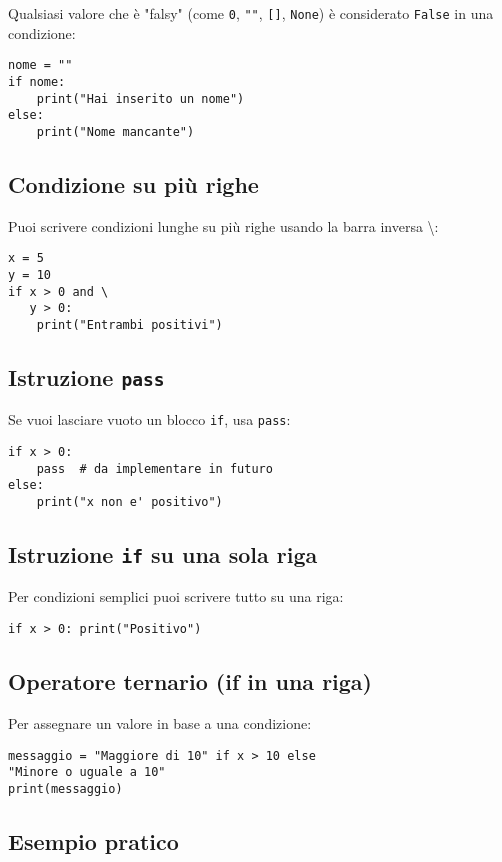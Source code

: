 \documentclass[a4paper,12pt]{article}
\begin{document}
Qualsiasi valore che è "falsy" (come \texttt{0}, \texttt{""}, \texttt{[]}, \texttt{None}) è considerato \texttt{False} in una condizione:
\begin{lstlisting}
nome = ""
if nome:
    print("Hai inserito un nome")
else:
    print("Nome mancante")
\end{lstlisting}

\subsection*{Condizione su più righe}

Puoi scrivere condizioni lunghe su più righe usando la barra inversa \textbackslash:
\begin{lstlisting}
x = 5
y = 10
if x > 0 and \
   y > 0:
    print("Entrambi positivi")
\end{lstlisting}

\subsection*{Istruzione \texttt{pass}}

Se vuoi lasciare vuoto un blocco \texttt{if}, usa \texttt{pass}:
\begin{lstlisting}
if x > 0:
    pass  # da implementare in futuro
else:
    print("x non e' positivo")
\end{lstlisting}

\subsection*{Istruzione \texttt{if} su una sola riga}

Per condizioni semplici puoi scrivere tutto su una riga:
\begin{lstlisting}
if x > 0: print("Positivo")
\end{lstlisting}

\subsection*{Operatore ternario (if in una riga)}

Per assegnare un valore in base a una condizione:
\begin{lstlisting}
messaggio = "Maggiore di 10" if x > 10 else
"Minore o uguale a 10"
print(messaggio)
\end{lstlisting}

\subsection*{Esempio pratico}
\end{document}
